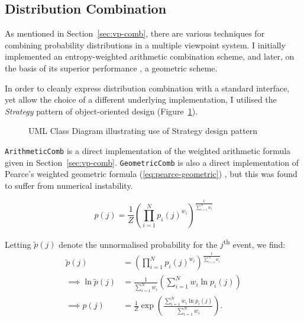 \documentclass[12pt,a4paper,twoside,openright]{report}
\begin{document}
\subsection{Distribution Combination}

As mentioned in Section~\ref{sec:vp-comb}, there are various techniques for
combining probability distributions in a multiple viewpoint system. I initially
implemented an entropy-weighted arithmetic combination scheme, and later, on the
basis of its superior performance \cite{pearce2004combining}, a geometric
scheme.  

In order to cleanly express distribution combination with a standard interface,
yet allow the choice of a different underlying implementation, I utilised the
\emph{Strategy} pattern of object-oriented design
(Figure~\ref{fig:dist-strategy-uml}).

\begin{figure}[H]
\centering
\caption{UML Class Diagram illustrating use of Strategy design pattern}
\label{fig:dist-strategy-uml}
\end{figure}

\texttt{ArithmeticComb} is a direct implementation of the weighted arithmetic
formula given in Section~\ref{sec:vp-comb}. \texttt{GeometricComb} is also a
direct implementation of Pearce's weighted geometric formula
(\ref{eq:pearce-geometric}) , but this was found to suffer from numerical
instability. 

\begin{equation}
p(j) = \frac{1}{Z} \left( \prod_{i = 1}^N p_i(j)^{w_i} \right)^{ \frac{1}{
\sum_{i = 1}^N w_i }} \label{eq:pearce-geometric}
\end{equation}

Letting $\widetilde{p}(j)$ denote the unnormalised probability for the
$j$\textsuperscript{th} event, we find:
\begin{align*}
  \widetilde{p}(j) &= \left( \prod_{i=1}^N p_i(j)^{w_i}
  \right)^{\frac{1}{\sum_{i=1}^N w_i}} \\[3mm]
  \implies \ln{\widetilde{p}(j)} &= \frac{1}{\sum_{i = 1}^N w_i} \left( \sum_{i
  = 1}^N w_i \ln{p_i(j)} \right) \\[3mm]
  \implies p(j) &= \frac{1}{Z} \exp \left( \frac{\sum_{i = 1}^N w_i \ln{ p_i(j)
  }}{ \sum_{i = 1}^N w_i } \right).
\end{align*}
\end{document}
